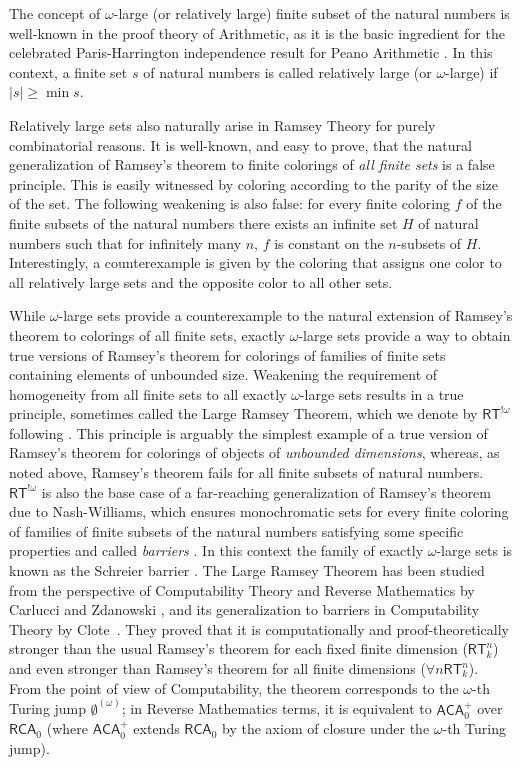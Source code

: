 \documentclass[10pt,a4paper]{article}
\newcommand{\RCA}[0]{\mathsf{RCA}}
\newcommand{\ACA}[0]{\mathsf{ACA}}
\newcommand{\RT}[0]{\mathsf{RT}}
\numberwithin{theorem}{section}
\begin{document}
The concept of $\omega$-large (or relatively large) finite subset of the natural numbers is well-known in the proof theory of Arithmetic, as it is the basic ingredient for the celebrated Paris-Harrington independence result for Peano Arithmetic \cite{Paris1977-PARAMI}. In this context, a finite set $s$ of natural numbers is called relatively large (or $\omega$-large) if $|s| \geq \min s$.

Relatively large sets also naturally arise in Ramsey Theory for purely combinatorial reasons. It is well-known, and easy to prove, that the natural generalization of Ramsey's theorem to finite colorings of {\em all finite sets} is a false principle. This is easily witnessed by coloring according to the parity of the size of the set. The following weakening is also false: for every finite coloring $f$ of the finite subsets of the natural numbers there exists an infinite set $H$ of natural numbers such that for infinitely many $n$, $f$ is constant on the $n$-subsets of $H$. Interestingly, a counterexample is given by the coloring that assigns one color to all relatively large sets and the opposite color to all other sets.

While $\omega$-large sets provide a counterexample to the natural extension of Ramsey's theorem to colorings of all finite sets, exactly $\omega$-large sets provide a way to obtain true versions of Ramsey's theorem for colorings of families of finite sets containing elements of unbounded size. Weakening the requirement of homogeneity from all finite sets to all exactly $\omega$-large sets results in a true principle, sometimes called the Large Ramsey Theorem, which we denote by $\RT^{!\omega}$ following \cite{carlucci2014strength}. This principle is arguably the simplest example of a true version of Ramsey's theorem for colorings of objects of {\em unbounded dimensions}, whereas, as noted above, Ramsey's theorem fails for all finite subsets of natural numbers. $\RT^{!\omega}$ is also the base case of a far-reaching generalization of Ramsey's theorem due to Nash-Williams, which ensures monochromatic sets for every finite coloring of families of finite subsets of the natural numbers satisfying some specific properties and called {\em barriers} \cite{Todorcevic+2010}. In this context the family of exactly $\omega$-large sets is known as the Schreier barrier \cite{Todorcevic+2010}.
The Large Ramsey Theorem has been studied from the perspective of Computability Theory and Reverse Mathematics by Carlucci and Zdanowski \cite{carlucci2014strength}, and its generalization to barriers in Computability Theory by Clote~\cite{clote1984recursion}. They proved that it is computationally and proof-theoretically stronger than the usual Ramsey's theorem for each fixed finite dimension ($\RT^n_k$) and even stronger than Ramsey's theorem for all finite dimensions ($\forall n \RT^n_k$). From the point of view of Computability, the theorem corresponds to the $\omega$-th Turing jump $\emptyset^{(\omega)}$; in Reverse Mathematics terms, it is equivalent to $\ACA_0^+$ over $\RCA_0$ (where $\ACA_0^+$ extends $\RCA_0$ by the axiom of closure under the $\omega$-th Turing jump).
\end{document}
